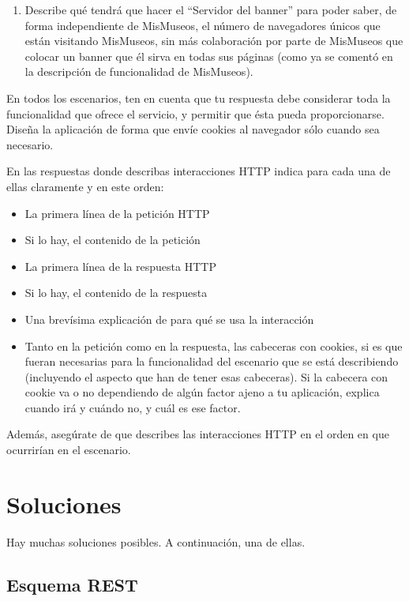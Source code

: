 {\begin{enumerate}
\item Describe qué tendrá que hacer el ``Servidor del banner'' para poder saber, de forma independiente de MisMuseos, el número de navegadores únicos que están visitando MisMuseos, sin más colaboración por parte de MisMuseos que colocar un banner que él sirva en todas sus páginas (como ya se comentó en la descripción de funcionalidad de MisMuseos).
\end{enumerate}

En todos los escenarios, ten en cuenta que tu respuesta debe considerar toda la funcionalidad que ofrece el servicio, y permitir que ésta pueda proporcionarse. Diseña la aplicación de forma que envíe cookies al navegador sólo cuando sea necesario.

En las respuestas donde describas interacciones HTTP indica para cada una de ellas claramente y en este orden:
  \begin{itemize}
  \item La primera línea de la petición HTTP
  \item Si lo hay, el contenido de la petición
  \item La primera línea de la respuesta HTTP
  \item Si lo hay, el contenido de la respuesta
  \item Una brevísima explicación de para qué se usa la interacción
  \item Tanto en la petición como en la respuesta, las cabeceras con cookies, si es que fueran necesarias para la funcionalidad del escenario que se está describiendo (incluyendo el aspecto que han de tener esas cabeceras). Si la cabecera con cookie va o no dependiendo de algún factor ajeno a tu aplicación, explica cuando irá y cuándo no, y cuál es ese factor.
  \end{itemize}

Además, asegúrate de que describes las interacciones HTTP en el orden en que ocurrirían en el escenario.

\section*{Soluciones}

Hay muchas soluciones posibles. A continuación, una de ellas.

\subsection*{Esquema REST}

}
